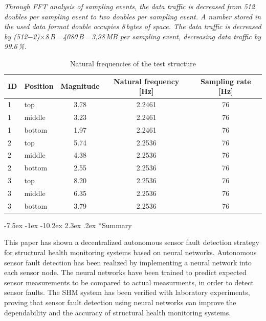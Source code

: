 \documentclass[12pt,a4paper]{scrartcl}
\makeatletter
\renewcommand\section{\@startsection{section}{1}{\z@}%
                     {-7.5ex \@plus -1ex \@minus -10.2ex}%
                     {2.3ex \@plus.2ex}%
                     {\sffamily\large\bfseries}}
\makeatother
\begin{document}
\textit{Through FFT analysis of sampling events, the data traffic is decreased from 512 doubles per sampling event to two doubles per sampling event.
A number stored in the used data format double occupies 8\,bytes of space.
The data traffic is decreased by (512$-$2)$\times$8\,B\,=\,4080\,B\,=\,3,98\,MB per sampling event, decreasing data traffic by 99.6\,\%.}


\begin{table}[hb]
	\centering
	\begin{tabular}{l l c c c}
		\toprule
		ID & Position & Magnitude & Natural frequency [Hz] & Sampling rate [Hz]\\ 
		\midrule
		1 & top & 3.78 & 2.2461 & 76\\ 
		1 & middle & 3.23 & 2.2461 & 76\\ 
		1 & bottom & 1.97 & 2.2461 & 76\\ 
		\midrule	
		2 & top & 5.74 & 2.2536 & 76\\  
		2 & middle & 4.38 & 2.2536 & 76\\ 
		2 & bottom & 2.55 & 2.2536 & 76\\
		\midrule
		3 & top & 8.20 & 2.2536 & 76\\
		3 & middle & 6.35 & 2.2536 & 76\\ 
		3 & bottom & 3.79 & 2.2536 & 76\\
		\bottomrule
	\end{tabular}
	\caption{Natural frequencies of the test structure}
	\label{tab:lab-ex}
\end{table}


\section*{Summary}

This paper has shown a decentralized autonomous sensor fault detection strategy for structural health monitoring systems based on neural networks. 
Autonomous sensor fault detection has been realized by implementing a neural network into each sensor node.
The neural networks have been trained to predict expected sensor measurements to be compared to actual measurments, in order to detect sensor faults.
The SHM system has been verified with laboratory experiments, proving that sensor fault detection using neural networks can improve the dependability and the accuracy of structural health monitoring systems.




\end{document}
